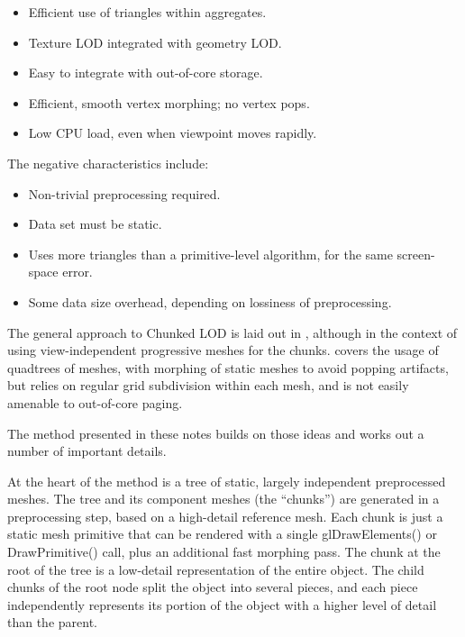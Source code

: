 \documentclass[12pt]{article}
\begin{document}
\begin{itemize}

\item Efficient use of triangles within aggregates.

\item Texture LOD integrated with geometry LOD.

\item Easy to integrate with out-of-core storage.

\item Efficient, smooth vertex morphing; no vertex pops.

\item Low CPU load, even when viewpoint moves rapidly.

\end{itemize}

The negative characteristics include:

\begin{itemize}

\item Non-trivial preprocessing required.

\item Data set must be static.

\item Uses more triangles than a primitive-level algorithm, for the same
  screen-space error.

\item Some data size overhead, depending on lossiness of preprocessing.

\end{itemize}

The general approach to Chunked LOD is laid out in \cite{bloom},
although in the context of using view-independent progressive meshes
for the chunks.  \cite{cline} covers the usage of quadtrees of meshes,
with morphing of static meshes to avoid popping artifacts, but relies
on regular grid subdivision within each mesh, and is not easily
amenable to out-of-core paging.

The method presented in these notes builds on those ideas and works
out a number of important details.
 
At the heart of the method is a tree of static, largely independent
preprocessed meshes.  The tree and its component meshes (the
``chunks'') are generated in a preprocessing step, based on a
high-detail reference mesh.  Each chunk is just a static mesh
primitive that can be rendered with a single glDrawElements() or
DrawPrimitive() call, plus an additional fast morphing pass.  The
chunk at the root of the tree is a low-detail representation of the
entire object.  The child chunks of the root node split the object
into several pieces, and each piece independently represents its
portion of the object with a higher level of detail than the parent.
 
\end{document}
